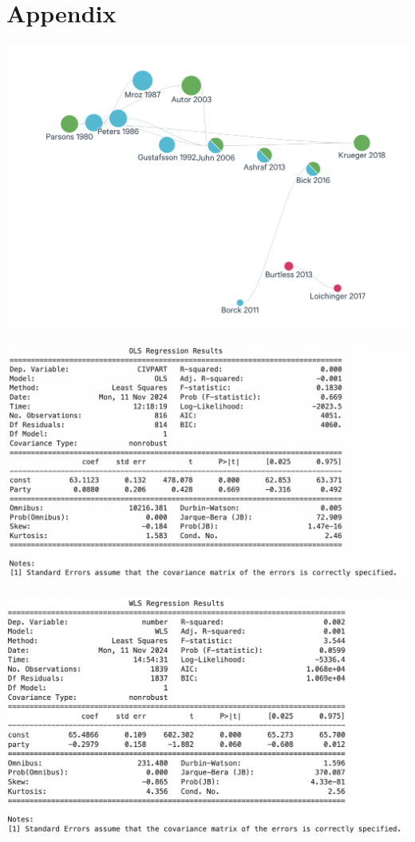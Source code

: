 \chapter{Appendix}

\includegraphics[width=0.7\linewidth]{files/litmap-8f985aea6f5acab8c2e3bdc1dbe2eff7.png}

\includegraphics[width=0.7\linewidth]{files/OLS-c5cf87287ef4675b97d7a4a27f7664a6.png}

\includegraphics[width=0.7\linewidth]{files/WLS-c513dc796a7e1b69f6856fefaa83e78e.png}